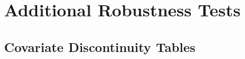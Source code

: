 



\clearpage

\section{Additional Robustness Tests} \label{sec:appxb}

\subsection{Covariate Discontinuity Tables}

